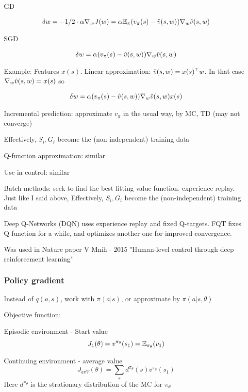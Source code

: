 \documentclass[english]{article}
\begin{document}
GD

$$\delta w=-1/2\cdot\alpha \nabla_w J(w)
=\alpha\mathbb{E}_\pi(v_\pi(s)-\hat{v}(s,w))\nabla_w\hat{v}(s,w)
$$

SGD

$$\delta w
=\alpha(v_\pi(s)-\hat{v}(s,w))\nabla_w\hat{v}(s,w)
$$



\item Example:  Features $x(s)$. Linear approximation: $\hat{v}(s,w) =x(s)^\top w$. In that case $\nabla_w\hat{v}(s,w) = x(s)$ so


$$\delta w
=\alpha(v_\pi(s)-\hat{v}(s,w))\nabla_w\hat{v}(s,w)x(s)
$$

\item Incremental prediction: approximate $v_\pi$ in the usual way, by MC, TD (may not converge)

Effectively, $S_i,G_i$ become the (non-independent) training data

\item Q-function approximation: similar

Use in control: similar

\item Batch methods: seek to find the best fitting value function. experience replay. Just like I said above, Effectively, $S_i,G_i$ become the (non-independent) training data


\item Deep Q-Networks (DQN) uses experience replay and fixed Q-targets. FQT fixes Q function for a while, and optimizes another one for improved convergence. 

Was used in Nature paper V Mnih - 2015 "Human-level control through deep reinforcement learning"

\eenum 




\subsubsection{Policy gradient}
\benum

\item Instead of $q(a,s)$, work with $\pi(a|s)$, or approximate by $\pi(a|s,\theta)$

\item Objective function: 

Episodic environment - Start value 
$$J_1(\theta) 
=
v^{\pi_\theta}(s_1) 
=
\mathbb{E}_{\pi_\theta}(v_1)$$

Continuing environment - average value 
$$J_{avV}(\theta) 
=
\sum_s d^{\pi_\theta}(s) v^{\pi_\theta}(s_1) 
$$
Here $d^{\pi_\theta}$ is the strationary distribution of the MC for $\pi_\theta$
\end{document}
